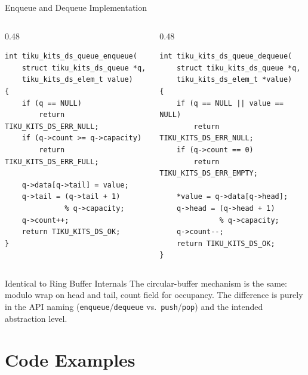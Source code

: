 \documentclass[aspectratio=169, 10pt]{beamer}
\begin{document}
\begin{frame}[fragile]{Enqueue and Dequeue Implementation}
\begin{columns}[T]
\begin{column}{0.48\textwidth}
\begin{lstlisting}[style=cstyle,
  title={enqueue --- write at tail, wrap}]
int tiku_kits_ds_queue_enqueue(
    struct tiku_kits_ds_queue *q,
    tiku_kits_ds_elem_t value)
{
    if (q == NULL)
        return TIKU_KITS_DS_ERR_NULL;
    if (q->count >= q->capacity)
        return TIKU_KITS_DS_ERR_FULL;

    q->data[q->tail] = value;
    q->tail = (q->tail + 1)
              % q->capacity;
    q->count++;
    return TIKU_KITS_DS_OK;
}
\end{lstlisting}
\end{column}

\begin{column}{0.48\textwidth}
\begin{lstlisting}[style=cstyle,
  title={dequeue --- read from head, wrap}]
int tiku_kits_ds_queue_dequeue(
    struct tiku_kits_ds_queue *q,
    tiku_kits_ds_elem_t *value)
{
    if (q == NULL || value == NULL)
        return TIKU_KITS_DS_ERR_NULL;
    if (q->count == 0)
        return TIKU_KITS_DS_ERR_EMPTY;

    *value = q->data[q->head];
    q->head = (q->head + 1)
              % q->capacity;
    q->count--;
    return TIKU_KITS_DS_OK;
}
\end{lstlisting}
\end{column}
\end{columns}

\vspace{0.3em}
\begin{block}{Identical to Ring Buffer Internals}
The circular-buffer mechanism is the same: modulo wrap on head and tail,
count field for occupancy. The difference is purely in the API naming
(\texttt{enqueue}/\texttt{dequeue} vs.\ \texttt{push}/\texttt{pop}) and
the intended abstraction level.
\end{block}
\end{frame}

\section{Code Examples}
\end{document}
